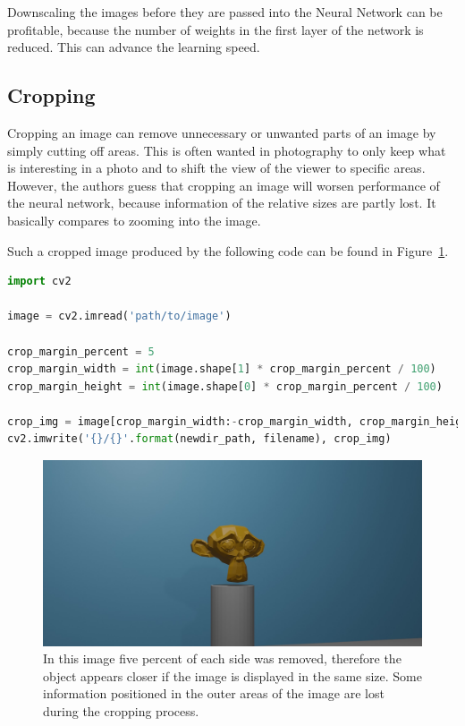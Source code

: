 Downscaling the images before they are passed into the Neural Network can be profitable, because the number of weights in the first layer of the network is reduced. This can advance the learning speed.

\subsection{Cropping}
Cropping an image can remove unnecessary or unwanted parts of an image by simply cutting off areas. This is often wanted in photography to only keep what is interesting in a photo and to shift the view of the viewer to specific areas. However, the authors guess that cropping an image will worsen performance of the neural network, because information of the relative sizes are partly lost. It basically compares to zooming into the image.

Such a cropped image produced by the following code can be found in Figure~\ref{pic:implementation_opencv_cropping}.

\begin{lstlisting}[language=python]
import cv2

image = cv2.imread('path/to/image')

crop_margin_percent = 5
crop_margin_width = int(image.shape[1] * crop_margin_percent / 100)
crop_margin_height = int(image.shape[0] * crop_margin_percent / 100)

crop_img = image[crop_margin_width:-crop_margin_width, crop_margin_height:-crop_margin_height]
cv2.imwrite('{}/{}'.format(newdir_path, filename), crop_img)
\end{lstlisting}

\begin{figure}[h!]
	\centering
	\includegraphics[width=4.5in]{img/implementation_opencv_cropping.jpg}
	\caption{In this image five percent of each side was removed, therefore the object appears closer if the image is displayed in the same size. Some information positioned in the outer areas of the image are lost during the cropping process.}
	\label{pic:implementation_opencv_cropping}
\end{figure}

